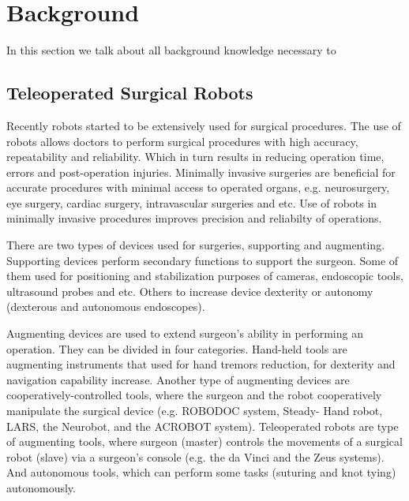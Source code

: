 \chapter{Background}
\label{back}

In this section we talk about all background knowledge necessary to 

\section{Teleoperated Surgical Robots}
\label{sec:daVinci}
Recently robots started to be extensively used for surgical procedures. The use of robots allows doctors to perform surgical procedures with high accuracy, repeatability and reliability. Which in turn results in reducing operation time, errors and post-operation injuries. Minimally invasive surgeries are beneficial for accurate procedures with minimal access to operated organs, e.g. neurosurgery, eye surgery, cardiac surgery, intravascular surgeries and etc.  Use of robots in minimally invasive procedures improves precision and reliabilty of operations. \cite{tavakoli_haptics_2008}

There are two types of devices used for surgeries, supporting and augmenting. 
Supporting devices perform secondary functions to support the surgeon.  Some of them used for positioning and stabilization purposes of cameras, endoscopic tools, ultrasound probes and etc. Others to increase device dexterity or autonomy (dexterous and autonomous endoscopes).

Augmenting devices are used to extend surgeon's ability in performing an operation. They can be divided in four categories. Hand-held tools are augmenting instruments that used for hand tremors reduction, for dexterity and navigation capability increase. Another type of augmenting devices are cooperatively-controlled tools, where the surgeon and the robot cooperatively manipulate the surgical device (e.g. ROBODOC system, Steady- Hand robot, LARS, the Neurobot, and the ACROBOT system). Teleoperated robots are type of augmenting tools, where surgeon (master) controls the movements of a surgical robot (slave) via a surgeon's console (e.g. the da Vinci and the Zeus systems). And autonomous tools, which can perform some tasks (suturing and knot tying) autonomously. \cite{tavakoli_haptics_2008}

